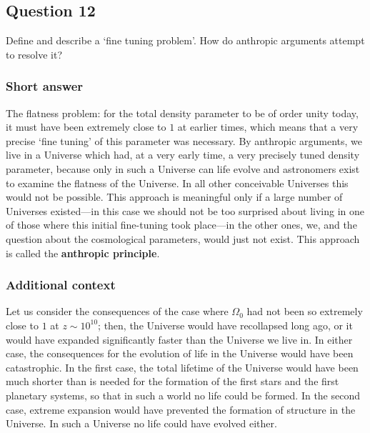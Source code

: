 \documentclass[a4paper,11pt]{article}
\begin{document}
%
%

\newpage
\subsection{Question 12}

Define and describe a `fine tuning problem'. How do anthropic arguments attempt to resolve it?

\subsubsection{Short answer}

The flatness problem: for the total density parameter to be of order unity today, it must have been extremely close to $1$ at earlier times, which means that a very precise `fine tuning' of this parameter was necessary. By anthropic arguments, we live in a Universe which had, at a very early time, a very precisely tuned density parameter, because only in such a Universe can life evolve and astronomers exist to examine the flatness of the Universe. In all other conceivable Universes this would not be possible. This approach is meaningful only if a large number of Universes existed—in this case we should not be too surprised about living in one of those where this initial fine-tuning took place—in the other ones, we, and the question about the cosmological parameters, would just not exist. This approach is called the \textbf{anthropic principle}.

\subsubsection{Additional context}

Let us consider the consequences of the case where $\Omega_0$ had not been so extremely close to $1$ at $z\sim10^{10}$; then, the Universe would have recollapsed long ago, or it would have expanded significantly faster than the Universe we live in. In either case, the consequences for the evolution of life in the Universe would have been catastrophic. In the first case, the total lifetime of the Universe would have been much shorter than is needed for the formation of the first stars and the first planetary systems, so that in such a world no life could be formed. In the second case, extreme expansion would have prevented the formation of structure in the Universe. In such a Universe no life could have evolved either. 
\end{document}

